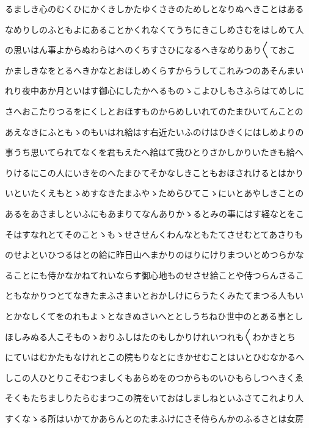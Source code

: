 \documentclass[a4paper,11pt,landscape]{ltjtarticle}
\begin{document}
\par\medskip
るましき心のむくひにかくきしかたゆくさきのためしとなりぬへきことはある
\par\medskip
なめりしのふともよにあることかくれなくてうちにきこしめさむをはしめて人
\par\medskip
の思いはん事よからぬわらはへのくちすさひになるへきなめりあり〱ておこ
\par\medskip
かましきなをとるへきかなとおほしめくらすからうしてこれみつのあそんまい
\par\medskip
れり夜中あか月といはす御心にしたかへるものゝこよひしもさふらはてめしに
\par\medskip
さへおこたりつるをにくしとおほすものからめしいれてのたまひいてんことの
\par\medskip
あえなきにふともゝのもいはれ給はす右近たいふのけはひきくにはしめよりの
\par\medskip
事うち思いてられてなくを君もえたへ給はて我ひとりさかしかりいたきも給へ
\par\medskip
りけるにこの人にいきをのへたまひてそかなしきこともおほされけるとはかり
\par\medskip
いといたくえもとゝめすなきたまふやゝためらひてこゝにいとあやしきことの
\par\medskip
あるをあさましといふにもあまりてなんありかゝるとみの事にはす経なとをこ
\par\medskip
そはすなれとてそのことゝもゝせさせんくわんなともたてさせむとてあさりも
\par\medskip
のせよといひつるはとの給に昨日山へまかりのほりにけりまついとめつらかな
\par\medskip
ることにも侍かなかねてれいならす御心地ものせさせ給ことや侍つらんさるこ
\par\medskip
ともなかりつとてなきたまふさまいとおかしけにらうたくみたてまつる人もい
\par\medskip
とかなしくてをのれもよゝとなきぬさいへととしうちねひ世中のとある事とし
\par\medskip
ほしみぬる人こそものゝおりふしはたのもしかりけれいつれも〱わかきとち
\par\medskip
にていはむかたもなけれとこの院もりなとにきかせむことはいとひむなかるへ
\par\medskip
しこの人ひとりこそむつましくもあらめをのつからものいひもらしつへきくゑ
\par\medskip
そくもたちましりたらむまつこの院をいておはしましねといふさてこれより人
\par\medskip
すくなゝる所はいかてかあらんとのたまふけにさそ侍らんかのふるさとは女房
\end{document}

